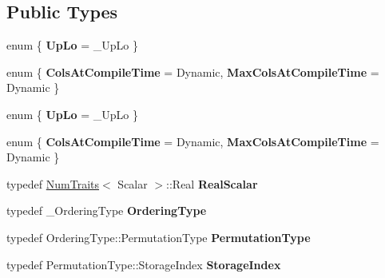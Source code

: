 \subsection*{Public Types}
\begin{DoxyCompactItemize}
\item 
\mbox{\label{class_eigen_1_1_incomplete_cholesky_af095f81d6a4772b852fb1b56cbb4ddc4}} 
enum \{ {\bfseries Up\+Lo} = \+\_\+\+Up\+Lo
 \}
\item 
\mbox{\label{class_eigen_1_1_incomplete_cholesky_ae827f25f78ad6f5ef996bedb5030663a}} 
enum \{ {\bfseries Cols\+At\+Compile\+Time} = Dynamic, 
{\bfseries Max\+Cols\+At\+Compile\+Time} = Dynamic
 \}
\item 
\mbox{\label{class_eigen_1_1_incomplete_cholesky_a4fff22305f320ab4a8609a5d5272affd}} 
enum \{ {\bfseries Up\+Lo} = \+\_\+\+Up\+Lo
 \}
\item 
\mbox{\label{class_eigen_1_1_incomplete_cholesky_af8df432e3a3cd6336a84602b7cd593ac}} 
enum \{ {\bfseries Cols\+At\+Compile\+Time} = Dynamic, 
{\bfseries Max\+Cols\+At\+Compile\+Time} = Dynamic
 \}
\item 
\mbox{\label{class_eigen_1_1_incomplete_cholesky_ae906362ed4ef090681a625b30a8a2352}} 
typedef \hyperlink{group___core___module_struct_eigen_1_1_num_traits}{Num\+Traits}$<$ Scalar $>$\+::Real {\bfseries Real\+Scalar}
\item 
\mbox{\label{class_eigen_1_1_incomplete_cholesky_ac9632ffaca343c90320ca8cf58c76cb4}} 
typedef \+\_\+\+Ordering\+Type {\bfseries Ordering\+Type}
\item 
\mbox{\label{class_eigen_1_1_incomplete_cholesky_aa85d6c80b460b94f23b5da2a7169adbf}} 
typedef Ordering\+Type\+::\+Permutation\+Type {\bfseries Permutation\+Type}
\item 
\mbox{\label{class_eigen_1_1_incomplete_cholesky_a121d37da7609158f8c9d3645da0318cc}} 
typedef Permutation\+Type\+::\+Storage\+Index {\bfseries Storage\+Index}

\end{DoxyCompactItemize}
